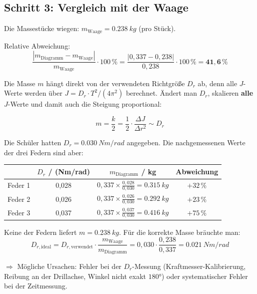 \documentclass[11pt,a4paper]{scrartcl}
\begin{document}
\subsection*{Schritt 3: Vergleich mit der Waage}

Die Massestücke wiegen: $m_\text{Waage} = \SI{0,238}{kg}$ (pro Stück).

Relative Abweichung:
\[
\frac{|m_\text{Diagramm} - m_\text{Waage}|}{m_\text{Waage}} \cdot 100\,\%
= \frac{|0{,}337 - 0{,}238|}{0{,}238} \cdot 100\,\% = \mathbf{41{,}6\,\%}
\]

\begin{infobox}[title={\faIcon{info-circle} Woher kommt die große Abweichung?}]
	Die Masse $m$ hängt direkt von der verwendeten Richtgröße $D_r$ ab, denn alle $J$-Werte werden über $J = D_r \cdot T^2 / (4\pi^2)$ berechnet. Ändert man $D_r$, skalieren \textbf{alle} $J$-Werte und damit auch die Steigung proportional:

	\[
	m = \frac{k}{2} = \frac{1}{2} \cdot \frac{\Delta J}{\Delta r^2} \sim D_r
	\]

	Die Schüler hatten $D_r = \SI{0,030}{Nm/rad}$ angegeben. Die nachgemessenen Werte der drei Federn sind aber:

	\vspace{0.3cm}
	\begin{center}
		\renewcommand{\arraystretch}{1.3}
		\begin{tabular}{|l|c|c|c|}
			\hline
			& $D_r$ / (Nm/rad) & $m_\text{Diagramm}$ / kg & Abweichung \\
			\hline
			Feder 1 & 0,028 & $0{,}337 \times \frac{0{,}028}{0{,}030} = \SI{0,315}{kg}$ & $+32\,\%$ \\
			\hline
			Feder 2 & 0,026 & $0{,}337 \times \frac{0{,}026}{0{,}030} = \SI{0,292}{kg}$ & $+23\,\%$ \\
			\hline
			Feder 3 & 0,037 & $0{,}337 \times \frac{0{,}037}{0{,}030} = \SI{0,416}{kg}$ & $+75\,\%$ \\
			\hline
		\end{tabular}
	\end{center}

	\vspace{0.3cm}
	Keine der Federn liefert $m = \SI{0,238}{kg}$.
	Für die korrekte Masse bräuchte man:
	\[
	D_{r,\text{ideal}} = D_{r,\text{verwendet}} \cdot \frac{m_\text{Waage}}{m_\text{Diagramm}} = 0{,}030 \cdot \frac{0{,}238}{0{,}337} = \SI{0,021}{Nm/rad}
	\]

	$\Rightarrow$ Mögliche Ursachen: Fehler bei der $D_r$-Messung (Kraftmesser-Kalibrierung, Reibung an der Drillachse, Winkel nicht exakt $180°$) oder systematischer Fehler bei der Zeitmessung.
\end{infobox}
\end{document}
